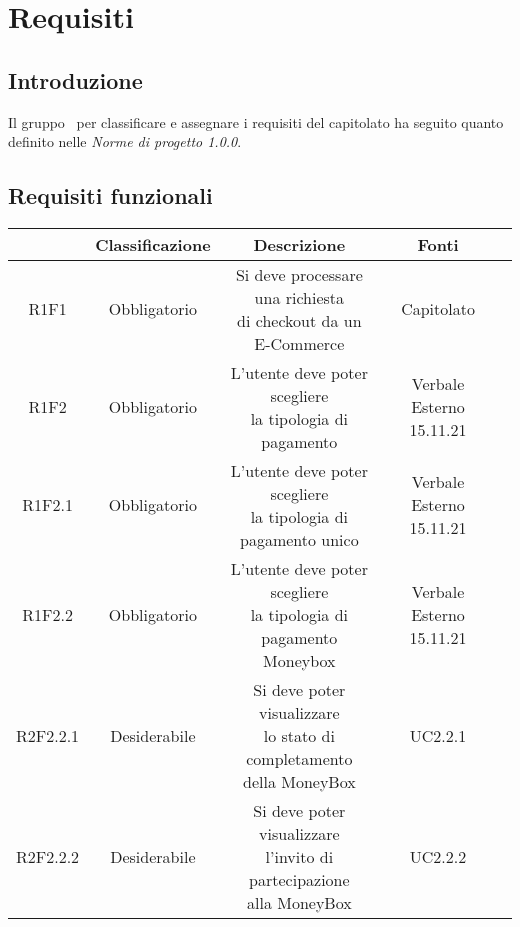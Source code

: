 \section{Requisiti}

\subsection{Introduzione}
Il gruppo \groupName\ per classificare e assegnare i requisiti del capitolato ha seguito quanto definito nelle \textit{Norme di progetto 1.0.0}.

\subsection{Requisiti funzionali}
\begin{center}
	\renewcommand{\arraystretch}{1.8}
	\begin{longtable}[c]{c | c | c | c | p{5cm}}
		\rowcolor[HTML]{125E28}
		\multicolumn{1}{c}{\color[HTML]{FFFFFF} \textbf{Codice}} & 
		\multicolumn{1}{c}{\color[HTML]{FFFFFF} \textbf{Classificazione}} & 
		\multicolumn{1}{c}{\color[HTML]{FFFFFF} \textbf{Descrizione}} & 
		\multicolumn{1}{c}{\color[HTML]{FFFFFF} \textbf{Fonti}} \\
		\endhead
        R1F1 & Obbligatorio & \shortstack{Si deve processare una richiesta\\ di checkout da un E-Commerce} & Capitolato \\
        R1F2 & Obbligatorio & \shortstack{L'utente deve poter scegliere \\la tipologia di pagamento} & Verbale Esterno 15.11.21 \\
        R1F2.1 & Obbligatorio & \shortstack{L'utente deve poter scegliere \\la tipologia di pagamento unico} & Verbale Esterno 15.11.21\\
        R1F2.2 & Obbligatorio & \shortstack{L'utente deve poter scegliere \\la tipologia di pagamento Moneybox} & Verbale Esterno 15.11.21\\
        R2F2.2.1 & Desiderabile &\shortstack{Si deve poter visualizzare \\lo stato di completamento \\della MoneyBox} & UC2.2.1 \\
        R2F2.2.2 & Desiderabile &\shortstack{Si deve poter visualizzare \\l'invito di partecipazione \\alla MoneyBox} & UC2.2.2 \\

\end{longtable}
\end{center}
